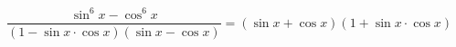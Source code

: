 \begin{ex}[type=prove_identity]
	\begin{condition}
		\( \dfrac{\sin^6x-\cos^6x}{(1-\sin x\cdot\cos x)(\sin x-\cos x)}=(\sin x+\cos x)(1+\sin x\cdot\cos x) \)
	\end{condition}
\end{ex}